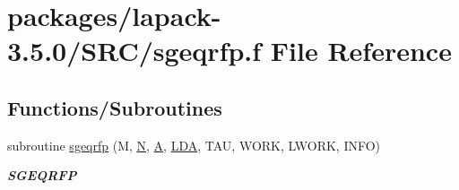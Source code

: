 \hypertarget{sgeqrfp_8f}{}\section{packages/lapack-\/3.5.0/\+S\+R\+C/sgeqrfp.f File Reference}
\label{sgeqrfp_8f}
\subsection*{Functions/\+Subroutines}
\begin{DoxyCompactItemize}
\item 
subroutine \hyperlink{group__realGEcomputational_ga3b9e414215d20cd99cbd3be489989a96}{sgeqrfp} (M, \hyperlink{polmisc_8c_a0240ac851181b84ac374872dc5434ee4}{N}, \hyperlink{classA}{A}, \hyperlink{example__user_8c_ae946da542ce0db94dced19b2ecefd1aa}{L\+D\+A}, T\+A\+U, W\+O\+R\+K, L\+W\+O\+R\+K, I\+N\+F\+O)
\begin{DoxyCompactList}\small\item\em {\bfseries S\+G\+E\+Q\+R\+F\+P} \end{DoxyCompactList}\end{DoxyCompactItemize}
